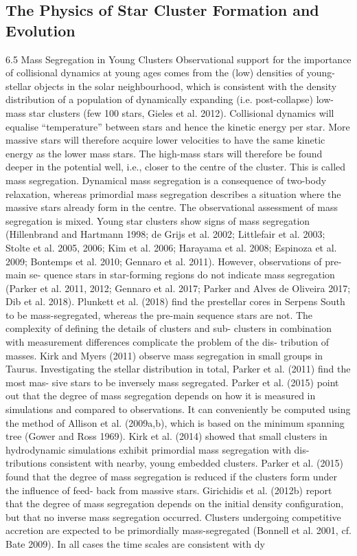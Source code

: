 \documentclass[../main.tex]{subfiles}
\begin{document}
{\subsection{The Physics of Star Cluster Formation and Evolution}


6.5 Mass Segregation in Young Clusters
Observational support for the importance of collisional dynamics at young ages comes from
the (low) densities of young-stellar objects in the solar neighbourhood, which is consistent
with the density distribution of a population of dynamically expanding (i.e. post-collapse)
low-mass star clusters (few 100 stars, Gieles et al. 2012).
Collisional dynamics will equalise “temperature” between stars and hence the kinetic
energy per star. More massive stars will therefore acquire lower velocities to have the same
kinetic energy as the lower mass stars. The high-mass stars will therefore be found deeper
in the potential well, i.e., closer to the centre of the cluster. This is called mass segregation.
Dynamical mass segregation is a consequence of two-body relaxation, whereas primordial
mass segregation describes a situation where the massive stars already form in the centre.
The observational assessment of mass segregation is mixed. Young star clusters show
signs of mass segregation (Hillenbrand and Hartmann 1998; de Grijs et al. 2002; Littlefair
et al. 2003; Stolte et al. 2005, 2006; Kim et al. 2006; Harayama et al. 2008; Espinoza et al.
2009; Bontemps et al. 2010; Gennaro et al. 2011). However, observations of pre-main se-
quence stars in star-forming regions do not indicate mass segregation (Parker et al. 2011,
2012; Gennaro et al. 2017; Parker and Alves de Oliveira 2017; Dib et al. 2018). Plunkett
et al. (2018) find the prestellar cores in Serpens South to be mass-segregated, whereas the
pre-main sequence stars are not. The complexity of defining the details of clusters and sub-
clusters in combination with measurement differences complicate the problem of the dis-
tribution of masses. Kirk and Myers (2011) observe mass segregation in small groups in
Taurus. Investigating the stellar distribution in total, Parker et al. (2011) find the most mas-
sive stars to be inversely mass segregated.
Parker et al. (2015) point out that the degree of mass segregation depends on how it is
measured in simulations and compared to observations.
It can conveniently be computed using the method of Allison et al. (2009a,b), which is
based on the minimum spanning tree (Gower and Ross 1969). Kirk et al. (2014) showed that
small clusters in hydrodynamic simulations exhibit primordial mass segregation with dis-
tributions consistent with nearby, young embedded clusters. Parker et al. (2015) found that
the degree of mass segregation is reduced if the clusters form under the influence of feed-
back from massive stars. Girichidis et al. (2012b) report that the degree of mass segregation
depends on the initial density configuration, but that no inverse mass segregation occurred.
Clusters undergoing competitive accretion are expected to be primordially mass-segregated
(Bonnell et al. 2001, cf. Bate 2009). In all cases the time scales are consistent with dy

}
\end{document}

